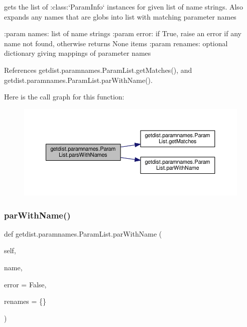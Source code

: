 \begin{DoxyVerb}gets the list of :class:`ParamInfo` instances for given list of name strings.
Also expands any names that are globs into list with matching parameter names

:param names: list of name strings
:param error: if True, raise an error if any name not found, otherwise returns None items
:param renames: optional dictionary giving mappings of parameter names
\end{DoxyVerb}
 

References getdist.\+paramnames.\+Param\+List.\+get\+Matches(), and getdist.\+paramnames.\+Param\+List.\+par\+With\+Name().

Here is the call graph for this function\+:
\nopagebreak
\begin{figure}[H]
\begin{center}
\leavevmode
\includegraphics[width=350pt]{classgetdist_1_1paramnames_1_1ParamList_ad267d72764306a71f58d6c051f2584b5_cgraph}
\end{center}
\end{figure}
\mbox{\label{classgetdist_1_1paramnames_1_1ParamList_a700a5bd1076df5b7a3fd00a102325175}} 
\subsubsection{\texorpdfstring{par\+With\+Name()}{parWithName()}}
{\footnotesize\ttfamily def getdist.\+paramnames.\+Param\+List.\+par\+With\+Name (\begin{DoxyParamCaption}\item[{}]{self,  }\item[{}]{name,  }\item[{}]{error = {\ttfamily False},  }\item[{}]{renames = {\ttfamily \{\}} }\end{DoxyParamCaption})}

